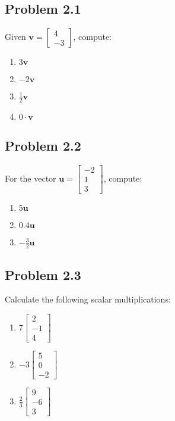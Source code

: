 \documentclass{article}
\begin{document}
\subsection{Problem 2.1}
Given $\mathbf{v} = \begin{bmatrix} 4 \\ -3 \end{bmatrix}$, compute:
\begin{enumerate}
\item $3\mathbf{v}$
\item $-2\mathbf{v}$
\item $\frac{1}{2}\mathbf{v}$
\item $0 \cdot \mathbf{v}$
\end{enumerate}

\subsection{Problem 2.2}
For the vector $\mathbf{u} = \begin{bmatrix} -2 \\ 1 \\ 3 \end{bmatrix}$, compute:
\begin{enumerate}
\item $5\mathbf{u}$
\item $0.4\mathbf{u}$
\item $-\frac{3}{2}\mathbf{u}$
\end{enumerate}

\subsection{Problem 2.3}
Calculate the following scalar multiplications:
\begin{enumerate}
\item $7 \begin{bmatrix} 2 \\ -1 \\ 4 \end{bmatrix}$
\item $-3 \begin{bmatrix} 5 \\ 0 \\ -2 \end{bmatrix}$
\item $\frac{2}{3} \begin{bmatrix} 9 \\ -6 \\ 3 \end{bmatrix}$
\end{enumerate}
\end{document}
